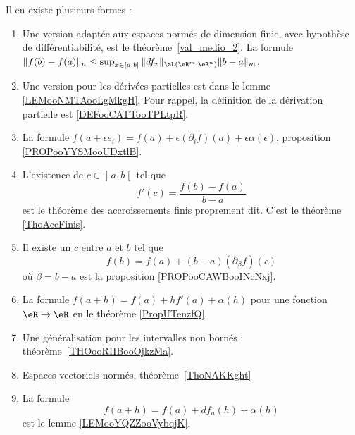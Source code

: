        \label{INTERNooXFNTooNNaOzP}
Il en existe plusieurs formes :
\begin{enumerate}
	\item
	      Une version adaptée aux espaces normés de dimension finie, avec hypothèse de différentiabilité, est le théorème~\ref{val_medio_2}. La formule \( \|f(b)-f(a)\|_n\leq \sup_{x\in[a,b]}\|df_x\|_{\aL(\eR^m,\eR^n)}\|b-a\|_m\).
	\item
	      Une version pour les dérivées partielles est dans le lemme \ref{LEMooNMTAooLgMkgH}. Pour rappel, la définition de la dérivation partielle est \ref{DEFooCATTooTPLtpR}.
	\item
	      La formule \( f(a+\epsilon e_i)=f(a)+\epsilon(\partial_if)(a)+\epsilon\alpha(\epsilon)\), proposition \ref{PROPooYYSMooUDxtlB}.
	\item
	      L'existence de \( c\in \mathopen] a , b \mathclose[\) tel que
	      \begin{equation}
		      f'(c)=\frac{ f(b)-f(a) }{ b-a }
	      \end{equation}
	      est le théorème des accroissements finis proprement dit. C'est le théorème \ref{ThoAccFinis}.
	\item
	      Il existe un \( c\) entre \( a\) et \( b\) tel que
	      \begin{equation}
		      f(b)=f(a)+(b-a)(\partial_{\beta}f)(c)
	      \end{equation}
	      où \( \beta=b-a\) est la proposition \ref{PROPooCAWBooINcNxj}.
	\item
	      La formule \( f(a+h)=f(a)+hf'(a)+\alpha(h)\) pour une fonction \( \eR\to \eR\) en le théorème \ref{PropUTenzfQ}.
	\item
	      Une généralisation pour les intervalles non bornés : théorème~\ref{THOooRIIBooOjkzMa}.
	\item
	      Espaces vectoriels normés, théorème~\ref{ThoNAKKght}
	\item
	      La formule
	      \begin{equation}
		      f(a+h)=f(a)+df_a(h)+\alpha(h)
	      \end{equation}
	      est le lemme \ref{LEMooYQZZooVybqjK}.
\end{enumerate}
